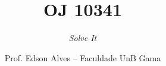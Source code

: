 \title{OJ 10341}
\subtitle{\textit{Solve It}}
\date{}
\author{Prof. Edson Alves -- Faculdade UnB Gama}
